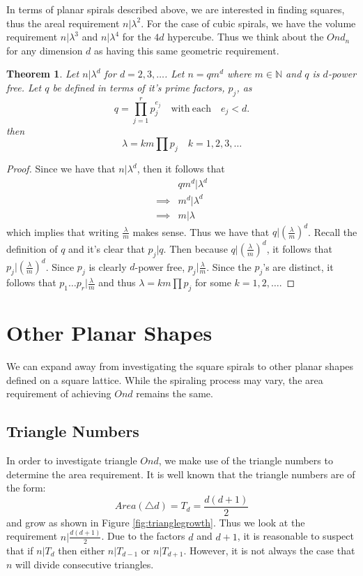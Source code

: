 \documentclass[11pt,reqno]{amsart}
\theoremstyle{mydef}
\newtheorem{thm}{Theorem}[section]
\begin{document}
In terms of planar spirals described above, we are interested
in finding squares, thus the areal requirement $n \vert \lambda^2$. For the case
of cubic spirals, we have the volume requirement $n \vert \lambda^3$ and $n 
\vert \lambda^4$ for the $4d$ hypercube. Thus we think about the $Ond_n$ for any 
dimension $d$ as having this same geometric requirement.

\begin{thm}
\label{dimdthm}
Let $n\vert \lambda^d$ for $d=2, 3, \ldots$. Let $n = qm^d$ where $m \in \mathbb{N}$ and $q$ is $d$-power 
free. Let $q$ be defined in terms of it's prime factors, $p_j$, as
\[
	q = \prod\limits_{j=1}^{r} p_j^{e_j}\quad \text{with}\ \text{each}\quad e_j < d.
\]
then
\[
	\lambda = k m \prod p_j \quad k = 1, 2, 3, \ldots
\]
\end{thm}

\begin{proof}
Since we have that $n \vert \lambda^d$, then it follows that
\begin{align*}
  & qm^d \vert \lambda^d\\
\implies & m^d \vert \lambda^d\\
\implies & m \vert \lambda 
\end{align*}
which implies that writing $\frac{\lambda}{m}$ makes sense. Thus we have 
that $q \vert (\frac{\lambda}{m})^d$. Recall the definition of $q$ and it's clear
that $p_j \vert q$. Then because $q \vert (\frac{\lambda}{m})^d$, it follows that
$p_j \vert (\frac{\lambda}{m})^d$.  Since $p_j$ is clearly $d$-power free, $p_j \vert \frac{\lambda}{m}$.
Since the $p_j$'s are distinct, it follows that $p_1 \dots p_r \vert \frac{\lambda}{m}$ 
and thus $\lambda = k m \prod p_j$ for some $k = 1, 2, \ldots$.
\end{proof}

\section{Other Planar Shapes}

We can expand away from investigating the square spirals to other planar shapes
defined on a square lattice. While the spiraling process may vary, the area
requirement of achieving $Ond$ remains the same.

\subsection{Triangle Numbers}

In order to investigate triangle $Ond$, we make use of the triangle numbers \cite{TriangleNumbers}
to determine the area requirement. It is well known that the triangle numbers are of the form:
\[
	Area(\triangle d) =  T_d =  \frac{d(d+1)}{2}
\]
and grow as shown in Figure \ref{fig:trianglegrowth}. Thus we look at the requirement 
$n \vert \frac{d(d+1)}{2}$. Due to the factors $d$ and $d+1$, it is reasonable to suspect
that if $n \vert T_d$ then either $n \vert T_{d-1}$ or $n \vert T_{d+1}$. However, it is not
always the case that $n$ will divide consecutive triangles.
\end{document}
